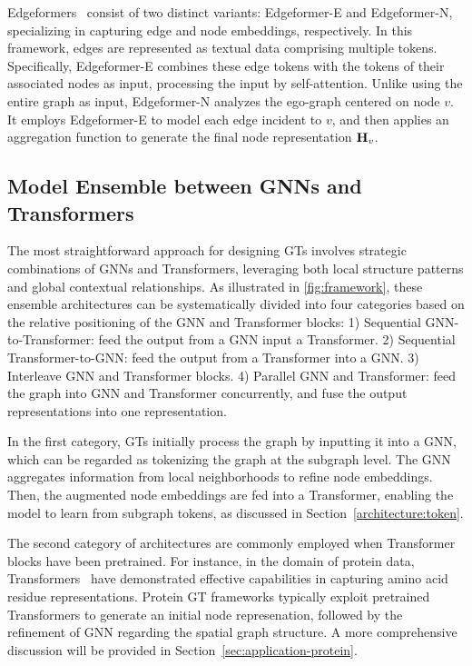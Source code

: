Edgeformers~\cite{jin2023edgeformers} consist of two distinct variants: Edgeformer-E and Edgeformer-N, specializing in capturing edge and node embeddings, respectively. In this framework, edges are represented as textual data comprising multiple tokens. 
Specifically, Edgeformer-E combines these edge tokens with the tokens of their associated nodes as input, processing the input by self-attention.
Unlike using the entire graph as input, Edgeformer-N analyzes the ego-graph centered on node $v$. It employs Edgeformer-E to model each edge incident to $v$, and then applies an aggregation function to generate the final node representation $\mathbf{H}_v$.





\subsection{Model Ensemble between GNNs and Transformers}
\label{architecture:Ensemble}
The most straightforward approach for designing GTs involves strategic combinations of GNNs and Transformers, leveraging both local structure patterns and global contextual relationships. As illustrated in \cref{fig:framework}, these ensemble architectures can be systematically divided into four categories based on the relative positioning of the GNN and Transformer blocks:
1) Sequential GNN-to-Transformer: feed the output from a GNN input a Transformer.
2) Sequential Transformer-to-GNN: feed the output from a Transformer into a GNN.
3) Interleave GNN and Transformer blocks.
4) Parallel GNN and Transformer:  feed the graph into GNN and Transformer concurrently, and fuse the output representations into one representation.


In the first category, GTs initially process the graph by inputting it into a GNN, which can be regarded as tokenizing the graph at the subgraph level. The GNN aggregates information from local neighborhoods to refine node embeddings. Then, the augmented node embeddings are fed into a Transformer, enabling the model to learn from subgraph tokens, as discussed in Section~\ref{architecture:token}.

The second category of architectures are commonly employed when Transformer blocks have been pretrained. For instance, in the domain of protein data, Transformers~\cite{lin2023evolutionary} have demonstrated effective capabilities in capturing amino acid residue  representations. 
Protein GT frameworks typically exploit pretrained Transformers to generate an initial node represenation, followed by the refinement of GNN regarding the spatial graph structure.
A more comprehensive discussion will be provided in Section~\ref{sec:application-protein}.

